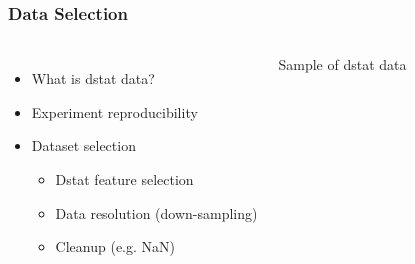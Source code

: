 \documentclass[aspectratio=169,11pt,hyperref={colorlinks=true}]{beamer}
\begin{document}
\begin{frame}
    \frametitle{Data Selection}
    \begin{columns}
        \begin{itemize}
            \item{What is dstat data?}
            \item{Experiment reproducibility}
            \item{Dataset selection}
            \begin{itemize}
              \item{Dstat feature selection}
              \item{Data resolution (down-sampling)}
              \item{Cleanup (e.g. NaN)}
            \end{itemize}
        \end{itemize}
      \begin{table}[h!]
        \begin{center}
          \caption{Sample of dstat data}
          \label{dstat_sample}
        \end{center}
     \end{table}
  \end{columns}
\end{frame}
\end{document}
